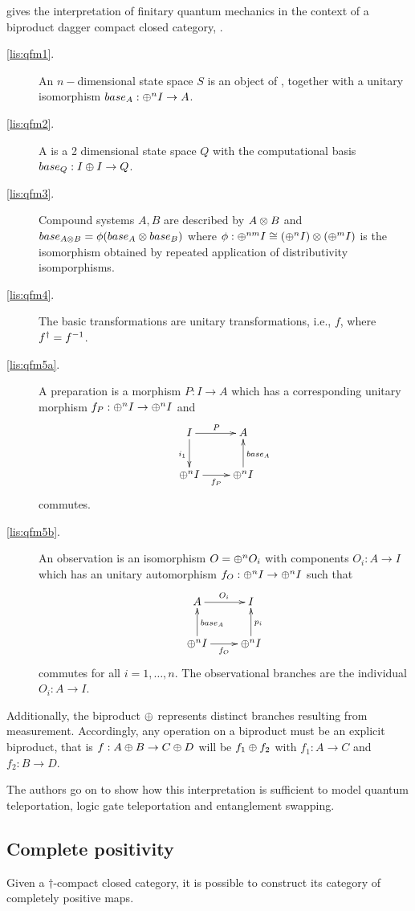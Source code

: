 \cite{abramsky04:catsemquantprot} gives the interpretation of finitary quantum mechanics in the
context of a biproduct dagger compact closed category, \cD.
\begin{description}
  \item[\ref{lis:qfm1}.] An $n-$dimensional state space $S$ is an object of \cD,
    together with a unitary isomorphism $base_{A}:\oplus^{n}I\to A$.
  \item[\ref{lis:qfm2}.] A \qubit is a 2 dimensional state space $Q$ with the computational basis
    $base_{Q}:I\oplus I \to Q$.
  \item[\ref{lis:qfm3}.] Compound systems $A,B$ are described by $A\otimes B$ and
    $base_{A\otimes B} = \phi (base_{A}\otimes base_{B})$ where $\phi:\oplus^{nm}I \cong(\oplus^{n}I)\otimes(\oplus^{m}I)$ is
    the isomorphism obtained by repeated application of distributivity isomporphisms.
  \item[\ref{lis:qfm4}.] The basic transformations are unitary transformations, i.e., $f$, where
    ${f}^{\dagger} = f^{-1}$.
  \item[\ref{lis:qfm5a}.] A preparation is a morphism $P:I \to A$ which has a corresponding unitary
    morphism $f_{P}:\oplus^{n}I\to\oplus^{n}I$ and
    \[
      \xymatrix{
        I \ar[r]^{P} \ar[d]_{i_{1}}& A\\
        \+^{n}I \ar[r]_{f_{P}} & \+^{n}I \ar[u]_{base_{A}}
      }
    \]
    commutes.
  \item[\ref{lis:qfm5b}.] An observation  is an isomorphism $O = \oplus^{n}O_{i}$ with components
    $O_{i}:A \to I$ which has an unitary automorphism $f_{O}:\oplus^{n}I\to\oplus^{n}I$ such that
    \[
      \xymatrix{
        A \ar[r]^{O_{i}} & I\\
        \+^{n}I \ar[r]_{f_{O}}  \ar[u]_{base_{A}} & \+^{n}I \ar[u]_{p_{i}}
      }
    \]
    commutes for all $i=1,\ldots,n$. The observational branches are the individual $O_{i}:A \to I$.
\end{description}
Additionally, the biproduct $\oplus$ represents distinct branches resulting from measurement.
Accordingly, any operation on a biproduct must be an explicit biproduct, that is $f:A\oplus B\to C\oplus D$
will be $f_{1}\oplus f_{2}$ with $f_{1}:A\to C$ and $f_{2}:B\to D$.

The authors go on to show how this interpretation is sufficient to model quantum teleportation,
logic gate teleportation and entanglement swapping.


\subsection{Complete positivity}\label{sec:completepositivity}
Given a $\dagger$-compact closed category, it is possible to construct its category of completely
positive maps.


